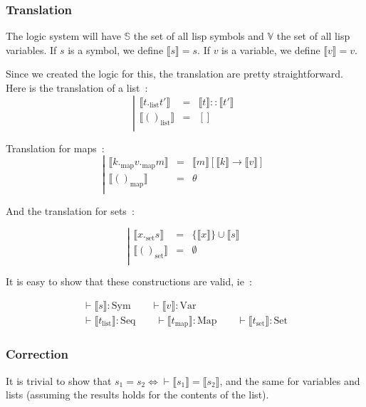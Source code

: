 \documentclass[]{article}
\newcommand{\sem}[1]{\llbracket #1 \rrbracket}
\newcommand{\V}{\mathscr{V}}
\newcommand{\1}{\mathbbm{1}}
\newcommand{\0}{\mathbbm{0}}
\renewcommand{\S}{\mathbb{S}}
\renewcommand{\V}{\mathbb{V}}
\newcommand{\Sym}{\text{Sym}}
\newcommand{\Var}{\text{Var}}
\newcommand{\Seq}{\text{Seq}}
\newcommand{\Map}{\text{Map}}
\newcommand{\Set}{\text{Set}}
\begin{document}
\subsubsection{Translation}

The logic system will have $\S$ the set of all lisp symbols and $\V$ the set
of all lisp variables. If $s$ is a symbol, we define $\sem{s} = s$. If $v$ is a
variable, we define $\sem{v} = v$.

Since we created the logic for this, the translation are pretty straightforward.
Here is the translation of a list~:
\[\left|\begin{array}{lcl}
    \sem{t._\text{list} t'} & = & \sem{t} :: \sem{t'} \\
    \sem{()_\text{list}}    & = & [] \\
\end{array}\right.\]

Translation for maps~:
\[\left|\begin{array}{lcl}
    \sem{k._\text{map}v._\text{map}m} & = & \sem{m}[\sem{k}\rightarrow\sem{v}] \\
    \sem{()_\text{map}} & = & \theta \\
\end{array}\right.\]

And the translation for sets~:

\[\left|\begin{array}{lcl}
    \sem{x._\text{set} s} & = & \{\sem{x}\}\cup\sem{s} \\
    \sem{()_\text{set}} & = & \emptyset \\
\end{array}\right.\]

It is easy to show that these constructions are valid, ie~:

\[\begin{gathered}
    \vdash \sem{s}:\Sym\qquad\vdash \sem{v}:\Var \\
    \vdash \sem{t_\text{list}}:\Seq
    \qquad\vdash\sem{t_\text{map}}:\Map
    \qquad\vdash\sem{t_\text{set}}:\Set
\end{gathered}\]

\subsubsection{Correction}

It is trivial to show that $s_1 = s_2 \iff \vdash \sem{s_1} = \sem{s_2}$, and
the same for variables and lists (assuming the results holds for the contents of
the list).

\end{document}

